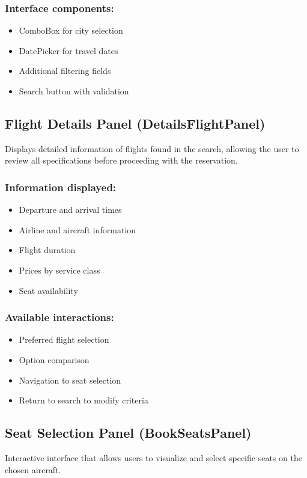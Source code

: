 \documentclass[conference]{IEEEtran}
\begin{document}
\subsubsection{Interface components:}
\begin{itemize}
    \item ComboBox for city selection
    \item DatePicker for travel dates
    \item Additional filtering fields
    \item Search button with validation
\end{itemize}

\subsection{Flight Details Panel (DetailsFlightPanel)}
Displays detailed information of flights found in the search, allowing the user to review all specifications before proceeding with the reservation.

\subsubsection{Information displayed:}
\begin{itemize}
    \item Departure and arrival times
    \item Airline and aircraft information
    \item Flight duration
    \item Prices by service class
    \item Seat availability
\end{itemize}

\subsubsection{Available interactions:}
\begin{itemize}
    \item Preferred flight selection
    \item Option comparison
    \item Navigation to seat selection
    \item Return to search to modify criteria
\end{itemize}

\subsection{Seat Selection Panel (BookSeatsPanel)}
Interactive interface that allows users to visualize and select specific seats on the chosen aircraft.
\end{document}
